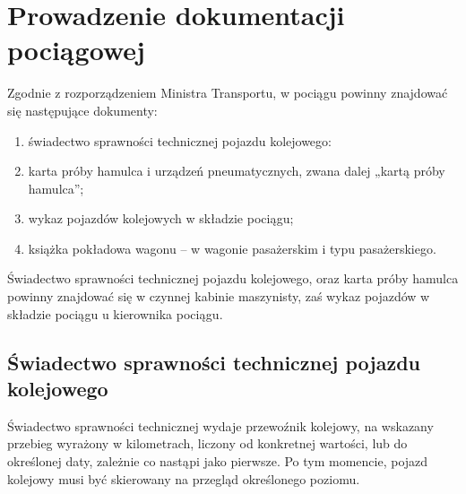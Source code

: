 \chapter{Prowadzenie dokumentacji pociągowej}

Zgodnie z rozporządzeniem Ministra Transportu, w pociągu powinny znajdować się następujące dokumenty:
\begin{enumerate}
	\item świadectwo sprawności technicznej pojazdu kolejowego:
	\item karta próby hamulca i urządzeń pneumatycznych, zwana dalej „kartą próby hamulca”;
	\item wykaz pojazdów kolejowych w składzie pociągu;
	\item książka pokładowa wagonu – w wagonie pasażerskim i typu pasażerskiego.
\end{enumerate}

Świadectwo sprawności technicznej pojazdu kolejowego, oraz karta próby hamulca powinny znajdować się w czynnej kabinie maszynisty, zaś wykaz pojazdów w składzie pociągu u kierownika pociągu.

\section{Świadectwo sprawności technicznej pojazdu kolejowego}
Świadectwo sprawności technicznej wydaje przewoźnik kolejowy, na wskazany przebieg wyrażony w kilometrach, liczony od konkretnej wartości, lub do określonej daty, zależnie co nastąpi jako pierwsze. Po tym momencie, pojazd kolejowy musi być skierowany na przegląd określonego poziomu.


